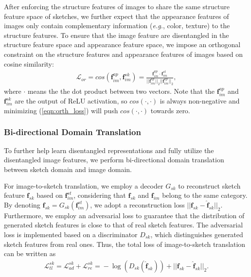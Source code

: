 \documentclass[10pt,twocolumn,letterpaper]{article}
\begin{document}
After enforcing the structure features of images to share the same structure feature space of sketches, we further expect that the appearance features of images only contain complementary information (\emph{e.g.}, color, texture) to the structure features.
To ensure that the image feature are disentangled in the structure feature space and appearance feature space, we impose an orthogonal constraint on the structure features and appearance features of images based on cosine similarity:
\vspace{-4pt}
\begin{align} \label{eqn:orth_loss}
    \mathcal{L}_{or} = cos(\mathbf{f}_{im}^{ap}, \mathbf{f}_{im}^{sk}) = \frac{\mathbf{f}_{im}^{ap} \cdot \mathbf{f}_{im}^{st}}{||\mathbf{f}_{im}^{ap}||_2 ||\mathbf{f}_{im}^{ap}||_2},
\end{align}
where $\cdot$ means the the dot product between two vectors.
Note that the $\mathbf{f}_{im}^{ap}$ and $\mathbf{f}_{im}^{sk}$ are the output of ReLU activation, so $cos(\cdot, \cdot)$ is always non-negative and minimizing (\ref{eqn:orth_loss}) will push $cos(\cdot, \cdot)$ towards zero.

\subsubsection{Bi-directional Domain Translation}
To further help learn disentangled representations and fully utilize the disentangled image features, we perform bi-directional domain translation between sketch domain and image domain.

For image-to-sketch translation, we employ a decoder $G_{sk}$ to reconstruct sketch feature $\mathbf{f}_{sk}$ based on $\mathbf{f}_{im}^{st}$, considering that $\mathbf{f}_{sk}$ and $\mathbf{f}_{im}$ belong to the same category. By denoting $\hat{\mathbf{f}}_{sk} = G_{sk}(\mathbf{f}_{im}^{st})$, we adopt a reconstruction loss $||\mathbf{f}_{sk}-\hat{\mathbf{f}}_{sk}||_2$. Furthermore, we employ an adversarial loss to guarantee that the distribution of generated sketch features is close to that of real sketch features. The adversarial loss is implemented based on a discriminator $D_{sk}$, which distinguishes generated sketch features from real ones. Thus, the total loss of image-to-sketch translation can be written as 
\vspace{-4pt}
\begin{align} \label{eqn:5}
    \mathcal{L}_{tl}^{sk}\!=\!\mathcal{L}_{ad}^{sk}\!+\!\mathcal{L}_{re}^{sk}\!=\!-\log(D_{sk}(\hat{\mathbf{f}}_{sk}))\!+\!||\mathbf{f}_{sk}-\hat{\mathbf{f}}_{sk}||_2.
\end{align}
\end{document}
